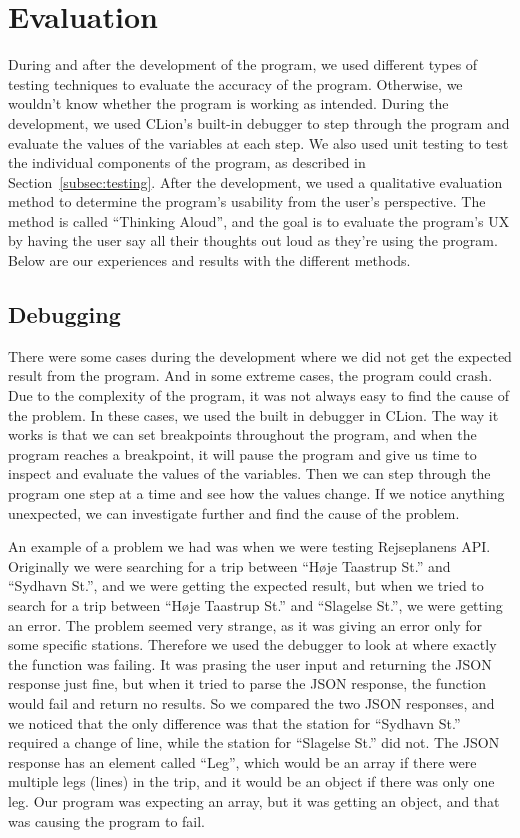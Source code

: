 \section{Evaluation}\label{sec:evaluation}

During and after the development of the program, we used different types of testing techniques to evaluate the accuracy
of the program.
Otherwise, we wouldn't know whether the program is working as intended.
During the development, we used CLion's built-in debugger to step through the program and evaluate the
values of the variables at each step.
We also used unit testing to test the individual components of the program, as described in
Section~\ref{subsec:testing}.
After the development, we used a qualitative evaluation method to determine the program's usability from the user's
perspective.
The method is called ``Thinking Aloud'', and the goal is to evaluate the program's UX by having the user say all their
thoughts out loud as they're using the program.
Below are our experiences and results with the different methods.

\subsection{Debugging}\label{subsec:debugging}

There were some cases during the development where we did not get the expected result from the program.
And in some extreme cases, the program could crash.
Due to the complexity of the program, it was not always easy to find the cause of the problem.
In these cases, we used the built in debugger in CLion.
The way it works is that we can set breakpoints throughout the program, and when the program reaches a breakpoint, it
will pause the program and give us time to inspect and evaluate the values of the variables.
Then we can step through the program one step at a time and see how the values change.
If we notice anything unexpected, we can investigate further and find the cause of the problem.

An example of a problem we had was when we were testing Rejseplanens API.
Originally we were searching for a trip between ``Høje Taastrup St.'' and ``Sydhavn St.'', and we were getting the
expected result, but when we tried to search for a trip between ``Høje Taastrup St.'' and ``Slagelse St.'', we were
getting an error.
The problem seemed very strange, as it was giving an error only for some specific stations.
Therefore we used the debugger to look at where exactly the function was failing.
It was prasing the user input and returning the JSON response just fine, but when it tried to parse the JSON response,
the function would fail and return no results.
So we compared the two JSON responses, and we noticed that the only difference was that the station for ``Sydhavn St.''
required a change of line, while the station for ``Slagelse St.'' did not.
The JSON response has an element called ``Leg'', which would be an array if there were multiple legs (lines) in the
trip, and it would be an object if there was only one leg.
Our program was expecting an array, but it was getting an object, and that was causing the program to fail.

